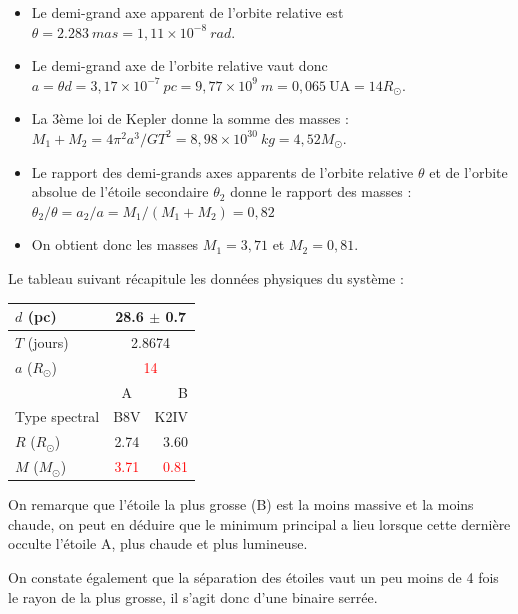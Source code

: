 \documentclass[a4paper,10pt]{report}
\newcommand{\UA}{\ensuremath{\textrm{UA}}}
\newcommand{\red}[1]{\textcolor{red}{#1}}
\begin{document}
\begin{Answer}
  \begin{itemize}
  \item Le demi-grand axe apparent de l'orbite relative est $\theta =
    2.283~mas = 1,11 \times 10^{-8}~rad$.
  \item Le demi-grand axe de l'orbite relative vaut donc $a = \theta d
    = 3,17 \times 10^{-7}~pc = 9,77 \times 10^9~m = 0,065~\UA =
    14R_{\odot}$.
  \item La 3ème loi de Kepler donne la somme des masses :
    $M_1+M_2 = 4\pi^2 a^3/GT^2 = 8,98 \times 10^{30}~kg =
    4,52M_{\odot}$.
  \item Le rapport des demi-grands axes apparents de l'orbite relative
    $\theta$ et de l'orbite absolue de l'étoile secondaire $\theta_2$
    donne le rapport des masses : $\theta_2 / \theta = a_2 / a = M_1 /
    (M_1 + M_2) = 0,82$
  \item On obtient donc les masses $M_1 = 3,71$ et $M_2 = 0,81$.
  \end{itemize}

  Le tableau suivant récapitule les données physiques du système :
  \begin{center}
    \begin{tabular}{|l|c|r|}
      \hline
      $d$ (pc) & \multicolumn{2}{c|}{28.6 $\pm$ 0.7} \\
      \hline
      $T$ (jours) & \multicolumn{2}{c|}{2.8674} \\
      \hline
      $a$ ($R_{\odot}$) &  \multicolumn{2}{c|}{\red{14}} \\
      \hline
      & A & B \\
      \cline{1-3}
      Type spectral & B8V & K2IV \\
      \hline
      $R$ ($R_{\odot}$) & 2.74 & 3.60 \\
      \hline
      $M$ ($M_{\odot}$) & \red{3.71} & \red{0.81} \\
      \hline
    \end{tabular}
  \end{center}
  On remarque que l'étoile la plus grosse (B) est la moins massive et
  la moins chaude, on peut en déduire que le minimum principal a lieu
  lorsque cette dernière occulte l'étoile A, plus chaude et plus
  lumineuse.

  On constate également que la séparation des étoiles vaut un peu
  moins de 4 fois le rayon de la plus grosse, il s'agit donc d'une
  binaire serrée.
\end{Answer}
\end{document}
